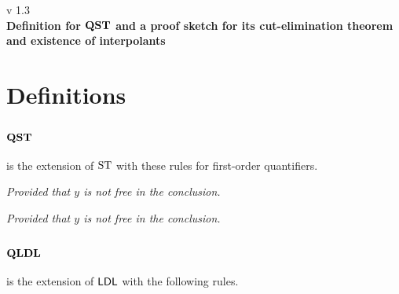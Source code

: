 \documentclass[a4paper, 12pt]{paper}
\begin{document}
{\noindent
	v 1.3 \\
{\large\textbf{Definition for $\qst$ and a proof sketch for its cut-elimination theorem and existence of interpolants}}
}
\\

\section{Definitions}

\subsection{$\qst$} is the extension of $\st$ with these rules for first-order quantifiers.

\begin{multicols}{2}
  \begin{prooftree}
  \end{prooftree}
  \columnbreak
  \begin{prooftree}
  \end{prooftree}
  \center
  \emph{Provided that $y$ is not free in the conclusion.}
\end{multicols}\vspace*{1em}
\begin{multicols}{2}
  \begin{prooftree}
  \end{prooftree}
  \center
  \emph{Provided that $y$ is not free in the conclusion.}
  \columnbreak
  \begin{prooftree}
  \end{prooftree}
\end{multicols}

\subsection{$\qldl$} is the extension of $\ldl$ with the following rules.
\end{document}
